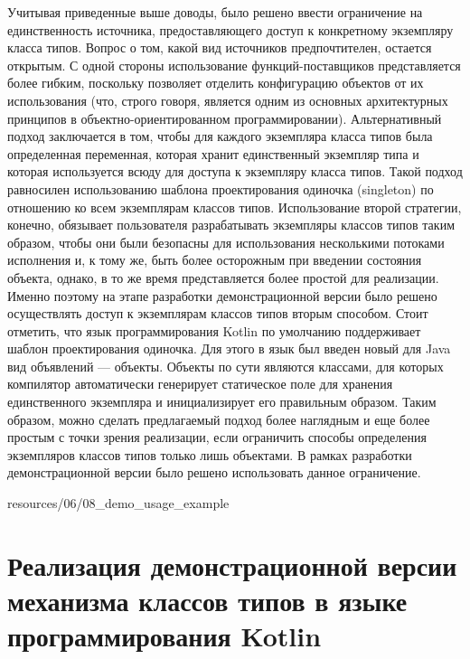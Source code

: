 Учитывая приведенные выше доводы, было решено ввести ограничение на единственность  источника, предоставляющего доступ к конкретному экземпляру класса типов. Вопрос о том, какой вид источников предпочтителен, остается открытым. С одной стороны использование функций-поставщиков представляется более гибким, поскольку позволяет отделить конфигурацию объектов от их использования (что, строго говоря, является одним из основных архитектурных принципов в объектно-ориентированном программировании). Альтернативный подход заключается в том, чтобы для каждого экземпляра класса типов была определенная переменная, которая хранит единственный экземпляр типа и которая используется всюду для доступа к экземпляру класса типов. Такой подход равносилен использованию шаблона проектирования  одиночка (singleton) по отношению ко всем экземплярам классов типов. Использование второй стратегии, конечно, обязывает пользователя разрабатывать экземпляры классов типов таким образом, чтобы они были безопасны для использования несколькими потоками исполнения и, к тому же, быть более осторожным при введении состояния объекта, однако, в то же время представляется более простой для реализации. Именно поэтому на этапе разработки демонстрационной версии было решено осуществлять доступ к экземплярам классов типов вторым способом. Стоит отметить, что язык программирования Kotlin по умолчанию поддерживает шаблон проектирования  одиночка. Для этого в язык был введен новый для Java вид объявлений --- объекты. Объекты по сути являются классами, для которых компилятор автоматически генерирует статическое поле для хранения единственного экземпляра и инициализирует его правильным образом. Таким образом, можно сделать предлагаемый подход более наглядным и еще более простым с точки зрения реализации, если ограничить способы определения экземпляров классов типов только лишь объектами. В рамках разработки демонстрационной версии было решено использовать данное ограничение. 


{resources/06/08_demo_usage_example}


\section{Реализация демонстрационной версии механизма классов типов в языке программирования Kotlin}

